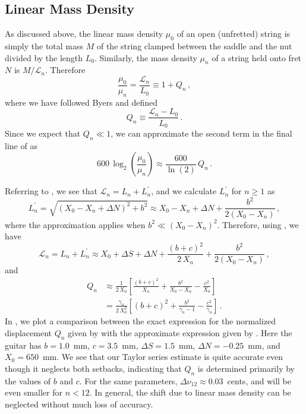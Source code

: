  \subsection{Linear Mass Density}
As discussed above, the linear mass density $\mu_0$ of an open (unfretted) string is simply the total mass $M$ of the string clamped between the saddle and the nut divided by the length $L_0$. Similarly, the mass density $\mu_n$ of a string held onto fret $N$ is $M/\mathcal{L}_n$. Therefore
 \begin{equation}
\frac{\mu_0}{\mu_n} = \frac{\mathcal{L}_n}{L_0} \equiv 1 + Q_n\, ,
 \end{equation}
where we have followed Byers and defined~\cite{ref:byers1996cgi,ref:varieschi2010icf}
 \begin{equation} \label{eqn:q_n_def}
Q_n \equiv \frac{\mathcal{L}_n - L_0}{L_0}\, .
 \end{equation}
Since we expect that $Q_n \ll 1$, we can approximate the second term in the final line of  as
 \begin{equation} \label{eqn:lmd_error}
600\, \log_2 \left(  \frac{\mu_0}{\mu_n} \right) \approx \frac{600}{\ln(2)}\, Q_n\, .
 \end{equation}

Referring to , we see that $\mathcal{L}_n = L_n + L^\prime_n$, and we calculate $L^\prime_n$ for $n \ge 1$ as
 \begin{equation} \label{eqn:l_p_def}
L^\prime_n = \sqrt{\left(X_0 - X_n + \Delta N\right)^2 + b^2} \approx X_0 - X_n + \Delta N + \frac{b^2}{2 \left(X_0 - X_n\right)}\, ,
 \end{equation}
where the approximation applies when $b^2 \ll (X_0 - X_n)^2$. Therefore, using , we have
 \begin{equation}
\mathcal{L}_n = L_n + L^\prime_n \approx X_0 + \Delta S + \Delta N + \frac{(b + c)^2}{2\, X_n} + \frac{b^2}{2 \left(X_0 - X_n\right)}\, ,
 \end{equation}
and
 \begin{equation} \label{eqn:q_n_approx}
 \begin{split}
Q_n &\approx \frac{1}{2\, X_0} \left[ \frac{(b + c)^2}{X_n} + \frac{b^2}{X_0 - X_n} - \frac{c^2}{X_0} \right] \\
&= \frac{\gamma_n}{2\, X_0^2} \left[ (b + c)^2 + \frac{b^2}{\gamma_{n} - 1} - \frac{c^2}{\gamma_n} \right] \, .
 \end{split}
 \end{equation}
In , we plot a comparison between the exact expression for the normalized displacement $Q_n$ given by  with the approximate expression given by . Here the guitar has $b = 1.0$~mm, $c = 3.5$~mm, $\Delta S = 1.5$~mm, $\Delta N = -0.25$~mm, and $X_0 = 650$~mm. We see that our Taylor series estimate is quite accurate even though it neglects both setbacks, indicating that $Q_n$ is determined primarily by the values of $b$ and $c$. For the same parameters, $\Delta \nu_{12} \approx 0.03$~cents, and will be even smaller for $n < 12$. In general, the shift due to linear mass density can be neglected without much loss of accuracy.

